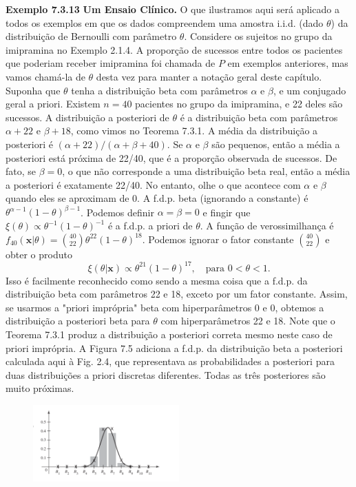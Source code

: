 \vspace{1cm}
\noindent\textbf{Exemplo 7.3.13} \quad \textbf{Um Ensaio Clínico.} O que ilustramos aqui será aplicado a todos os exemplos em que os dados compreendem uma amostra i.i.d. (dado $\theta$) da distribuição de Bernoulli com parâmetro $\theta$. Considere os sujeitos no grupo da imipramina no Exemplo 2.1.4. A proporção de sucessos entre todos os pacientes que poderiam receber imipramina foi chamada de $P$ em exemplos anteriores, mas vamos chamá-la de $\theta$ desta vez para manter a notação geral deste capítulo. Suponha que $\theta$ tenha a distribuição beta com parâmetros $\alpha$ e $\beta$, e um conjugado geral a priori. Existem $n=40$ pacientes no grupo da imipramina, e 22 deles são sucessos. A distribuição a posteriori de $\theta$ é a distribuição beta com parâmetros $\alpha+22$ e $\beta+18$, como vimos no Teorema 7.3.1. A média da distribuição a posteriori é $(\alpha+22)/(\alpha+\beta+40)$. Se $\alpha$ e $\beta$ são pequenos, então a média a posteriori está próxima de 22/40, que é a proporção observada de sucessos. De fato, se $\beta=0$, o que não corresponde a uma distribuição beta real, então a média a posteriori é exatamente 22/40. No entanto, olhe o que acontece com $\alpha$ e $\beta$ quando eles se aproximam de 0. A f.d.p. beta (ignorando a constante) é $\theta^{\alpha-1}(1-\theta)^{\beta-1}$. Podemos definir $\alpha=\beta=0$ e fingir que $\xi(\theta) \propto \theta^{-1}(1-\theta)^{-1}$ é a f.d.p. a priori de $\theta$. A função de verossimilhança é $f_{40}(\mathbf{x}|\theta) = \binom{40}{22}\theta^{22}(1-\theta)^{18}$. Podemos ignorar o fator constante $\binom{40}{22}$ e obter o produto
$$ \xi(\theta|\mathbf{x}) \propto \theta^{21}(1-\theta)^{17}, \quad \text{para } 0<\theta<1. $$
Isso é facilmente reconhecido como sendo a mesma coisa que a f.d.p. da distribuição beta com parâmetros 22 e 18, exceto por um fator constante. Assim, se usarmos a "priori imprópria" beta com hiperparâmetros 0 e 0, obtemos a distribuição a posteriori beta para $\theta$ com hiperparâmetros 22 e 18. Note que o Teorema 7.3.1 produz a distribuição a posteriori correta mesmo neste caso de priori imprópria. A Figura 7.5 adiciona a f.d.p. da distribuição beta a posteriori calculada aqui à Fig. 2.4, que representava as probabilidades a posteriori para duas distribuições a priori discretas diferentes. Todas as três posteriores são muito próximas.

\vspace{1cm}
\begin{figure}[H]

\centering

\includegraphics[width=0.5\textwidth]{img/7_3/img_3.png}

\end{figure}\vspace{1cm}

